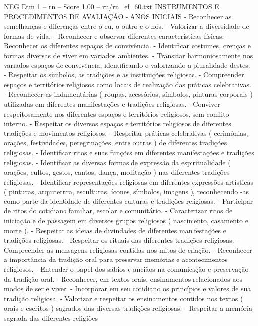 \begin{textsample}{NEG Dim 1 – rn – Score 1.00 – rn/rn\_ef\_60.txt}  \label{ex:f1_neg_023}
INSTRUMENTOS E PROCEDIMENTOS DE AVALIAÇÃO - ANOS INICIAIS - Reconhecer as semelhanças e diferenças entre o eu, o outro e o nós. - Valorizar a diversidade de formas de vida. - Reconhecer e observar diferentes características físicas. - Reconhecer os diferentes espaços de convivência. - Identificar costumes, crenças e formas diversas de viver em variados ambientes. - Transitar harmoniosamente nos variados espaços de convivência, identificando e valorizando a pluralidade destes. - Respeitar os símbolos, as tradições e as instituições religiosas. - Compreender espaços e territórios religiosos como locais de realização das práticas celebrativas. - Reconhecer as indumentárias ( roupas, acessórios, símbolos, pinturas corporais ) utilizadas em diferentes manifestações e tradições religiosas. - Conviver respeitosamente nos diferentes espaços e territórios religiosos, sem conflito interno. - Respeitar os diversos espaços e territórios religiosos de diferentes tradições e movimentos religiosos. - Respeitar práticas celebrativas ( cerimônias, orações, festividades, peregrinações, entre outras ) de diferentes tradições religiosas. - Identificar ritos e suas funções em diferentes manifestações e tradições religiosas. - Identificar as diversas formas de expressão da espiritualidade ( orações, cultos, gestos, cantos, dança, meditação ) nas diferentes tradições religiosas. - Identificar representações religiosas em diferentes expressões artísticas ( pinturas, arquitetura, esculturas, ícones, símbolos, imagens ), reconhecendo -as como parte da identidade de diferentes culturas e tradições religiosas. - Participar de ritos do cotidiano familiar, escolar e comunitário. - Caracterizar ritos de iniciação e de passagem em diversos grupos religiosos ( nascimento, casamento e morte ). - Respeitar as ideias de divindades de diferentes manifestações e tradições religiosas. - Respeitar os rituais das diferentes tradições religiosas. - Compreender as mensagens religiosas contidas nos mitos de criação. - Reconhecer a importância da tradição oral para preservar memórias e acontecimentos religiosos. - Entender o papel dos sábios e anciãos na comunicação e preservação da tradição oral. - Reconhecer, em textos orais, ensinamentos relacionados aos modos de ser e viver. - Incorporar em seu cotidiano os princípios e valores de sua tradição religiosa. - Valorizar e respeitar os ensinamentos contidos nos textos ( orais e escritos ) sagrados das diversas tradições religiosas. - Respeitar a memória sagrada das diferentes religiões

\end{textsample}
